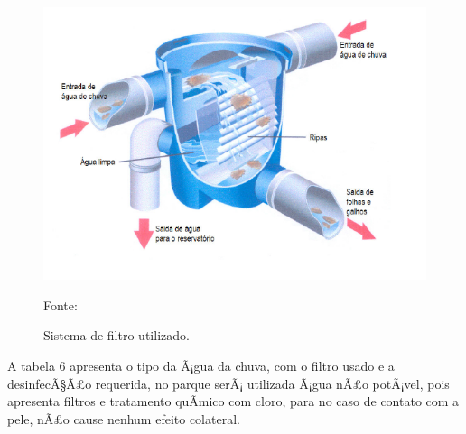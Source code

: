 \begin{figure}[H]
	 \centering
	\label{Sistema de filtro utilizado}
	 \includegraphics[scale=0.6]{captacao/10.png}
	 \caption{Sistema de filtro utilizado.}
	  \small{Fonte: \cite{ECOCASA}}
\end{figure}

A tabela 6 apresenta o tipo da Ã¡gua da chuva, com o filtro usado e a desinfecÃ§Ã£o requerida, no parque serÃ¡ utilizada Ã¡gua nÃ£o potÃ¡vel, pois apresenta filtros e tratamento quÃ­mico com cloro, para no caso de contato com a pele, nÃ£o cause nenhum efeito colateral.

